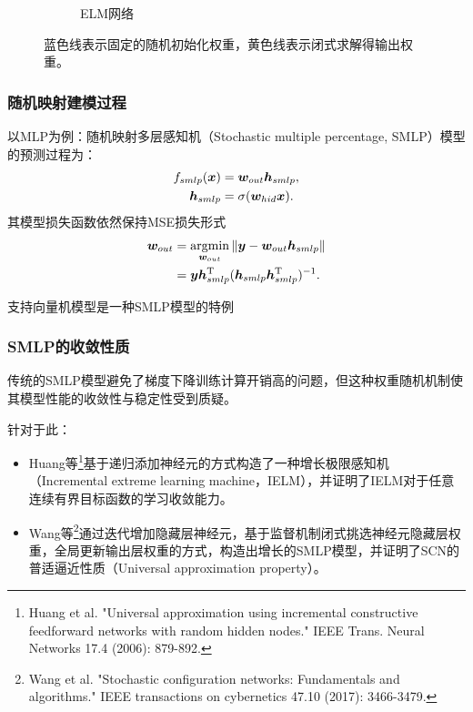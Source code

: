 \begin{frame}
\begin{figure}[H]
\begin{subfigure}[b]{0.25\textwidth}
                \caption{ELM网络}
            \end{subfigure}
            \caption*{\label{fig:randomnet}蓝色线表示固定的随机初始化权重，黄色线表示闭式求解得输出权重。}
        \end{figure}
        
    \end{frame}

    \begin{frame}
        \frametitle{随机映射建模过程}
    
        以MLP为例：随机映射多层感知机（Stochastic multiple percentage, SMLP）模型的预测过程为：
        \begin{align*}
            f_{smlp}(\bm{x}) &= \bm{w}_{out}\bm{h}_{smlp}, \\
            \bm{h}_{smlp} &= \sigma (\bm{w}_{hid}\bm{x}). \notag
        \end{align*}
        其模型损失函数依然保持MSE损失形式
        \begin{align*}
            \bm{w}_{out} &= \operatorname*{argmin}_{\bm{w}_{out}} \left \lVert \bm{y} - \bm{w}_{out}\bm{h}_{smlp} \right \rVert \\ 
            & = \bm{y} \bm{h}_{smlp}^{\mathrm{T}} (\bm{h}_{smlp}\bm{h}_{smlp}^{\mathrm{T}})^{-1}. \notag
        \end{align*}
    
        支持向量机模型是一种SMLP模型的特例
    \end{frame}

    \begin{frame}
        \frametitle{SMLP的收敛性质}
    
        传统的SMLP模型避免了梯度下降训练计算开销高的问题，但这种权重随机机制使其模型性能的收敛性与稳定性受到质疑。
    
        针对于此：
        \begin{itemize}
            \item Huang等\footnote{Huang et al. "Universal approximation using incremental constructive feedforward networks with random hidden nodes." IEEE Trans. Neural Networks 17.4 (2006): 879-892.}基于递归添加神经元的方式构造了一种增长极限感知机（Incremental extreme learning machine，IELM），并证明了IELM对于任意连续有界目标函数的学习收敛能力。
            \item Wang等\footnote{Wang et al. "Stochastic configuration networks: Fundamentals and algorithms." IEEE transactions on cybernetics 47.10 (2017): 3466-3479.}通过迭代增加隐藏层神经元，基于监督机制闭式挑选神经元隐藏层权重，全局更新输出层权重的方式，构造出增长的SMLP模型，并证明了SCN的普适逼近性质（Universal approximation property）。
        \end{itemize}
        
    \end{frame}

